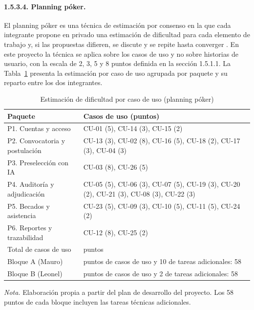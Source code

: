 \paragraph{1.5.3.4. Planning póker.}

El planning póker es una técnica de estimación por consenso en la que cada integrante propone en privado una estimación de dificultad para cada elemento de trabajo y, si las propuestas difieren, se discute y se repite hasta converger \parencite{cohn2005agile}. En este proyecto la técnica se aplica sobre los casos de uso y no sobre historias de usuario, con la escala de 2, 3, 5 y 8 puntos definida en la sección 1.5.1.1. La Tabla~\ref{tab:planning_poker} presenta la estimación por caso de uso agrupada por paquete y su reparto entre los dos integrantes.

\begin{table}[H]
\caption{Estimación de dificultad por caso de uso (planning póker)}
\label{tab:planning_poker}
\begin{threeparttable}
\begin{tabular}{>{\raggedright\arraybackslash}p{3.6cm} >{\raggedright\arraybackslash}p{9.4cm}}
\toprule
Paquete & Casos de uso (puntos) \\
\midrule
P1. Cuentas y acceso & CU-01 (5), CU-14 (3), CU-15 (2) \\
P2. Convocatoria y postulación & CU-13 (3), CU-02 (8), CU-16 (5), CU-18 (2), CU-17 (3), CU-04 (3) \\
P3. Preselección con IA & CU-03 (8), CU-26 (5) \\
P4. Auditoría y adjudicación & CU-05 (5), CU-06 (3), CU-07 (5), CU-19 (3), CU-20 (2), CU-21 (3), CU-08 (3), CU-22 (3) \\
P5. Becados y asistencia & CU-23 (5), CU-09 (3), CU-10 (5), CU-11 (5), CU-24 (2) \\
P6. Reportes y trazabilidad & CU-12 (8), CU-25 (2) \\
\midrule
Total de casos de uso & 104 puntos \\
Bloque A (Mauro) & 48 puntos de casos de uso y 10 de tareas adicionales: 58 \\
Bloque B (Leonel) & 56 puntos de casos de uso y 2 de tareas adicionales: 58 \\
\bottomrule
\end{tabular}
\begin{tablenotes}
\item \textit{Nota.} Elaboración propia a partir del plan de desarrollo del proyecto. Los 58 puntos de cada bloque incluyen las tareas técnicas adicionales.
\end{tablenotes}
\end{threeparttable}
\end{table}

